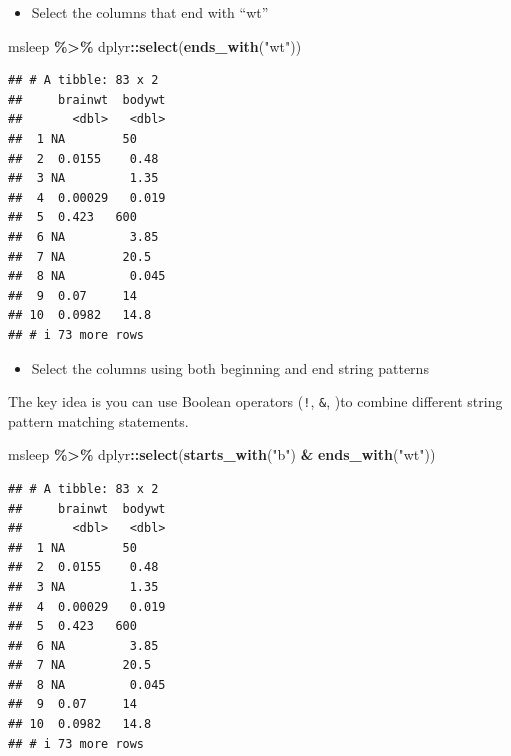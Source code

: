\documentclass[
]{book}
\newenvironment{Shaded}{\begin{snugshade}}{\end{snugshade}}
\newcommand{\FunctionTok}[1]{\textcolor[rgb]{0.13,0.29,0.53}{\textbf{#1}}}
\newcommand{\NormalTok}[1]{#1}
\newcommand{\SpecialCharTok}[1]{\textcolor[rgb]{0.81,0.36,0.00}{\textbf{#1}}}
\newcommand{\StringTok}[1]{\textcolor[rgb]{0.31,0.60,0.02}{#1}}
\providecommand{\tightlist}{%
  \setlength{\itemsep}{0pt}\setlength{\parskip}{0pt}}
\begin{document}
\begin{itemize}
\tightlist
\item
  Select the columns that end with ``wt''
\end{itemize}

\begin{Shaded}
\begin{Highlighting}[]
\NormalTok{msleep }\SpecialCharTok{\%\textgreater{}\%}
\NormalTok{  dplyr}\SpecialCharTok{::}\FunctionTok{select}\NormalTok{(}\FunctionTok{ends\_with}\NormalTok{(}\StringTok{"wt"}\NormalTok{))}
\end{Highlighting}
\end{Shaded}

\begin{verbatim}
## # A tibble: 83 x 2
##     brainwt  bodywt
##       <dbl>   <dbl>
##  1 NA        50    
##  2  0.0155    0.48 
##  3 NA         1.35 
##  4  0.00029   0.019
##  5  0.423   600    
##  6 NA         3.85 
##  7 NA        20.5  
##  8 NA         0.045
##  9  0.07     14    
## 10  0.0982   14.8  
## # i 73 more rows
\end{verbatim}

\begin{itemize}
\tightlist
\item
  Select the columns using both beginning and end string patterns
\end{itemize}

The key idea is you can use Boolean operators (\texttt{!}, \texttt{\&}, \texttt{\textbar{}})to combine different string pattern matching statements.

\begin{Shaded}
\begin{Highlighting}[]
\NormalTok{msleep }\SpecialCharTok{\%\textgreater{}\%}
\NormalTok{  dplyr}\SpecialCharTok{::}\FunctionTok{select}\NormalTok{(}\FunctionTok{starts\_with}\NormalTok{(}\StringTok{"b"}\NormalTok{) }\SpecialCharTok{\&} \FunctionTok{ends\_with}\NormalTok{(}\StringTok{"wt"}\NormalTok{))}
\end{Highlighting}
\end{Shaded}

\begin{verbatim}
## # A tibble: 83 x 2
##     brainwt  bodywt
##       <dbl>   <dbl>
##  1 NA        50    
##  2  0.0155    0.48 
##  3 NA         1.35 
##  4  0.00029   0.019
##  5  0.423   600    
##  6 NA         3.85 
##  7 NA        20.5  
##  8 NA         0.045
##  9  0.07     14    
## 10  0.0982   14.8  
## # i 73 more rows
\end{verbatim}
\end{document}
